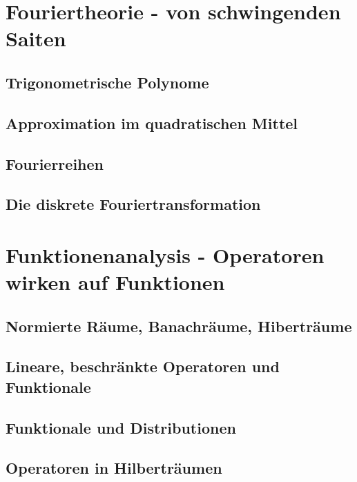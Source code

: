 \documentclass[a4paper]{article}
\begin{document}
\newpage
\section{Fouriertheorie - von schwingenden Saiten}
\subsection{Trigonometrische Polynome}


\subsection{Approximation im quadratischen Mittel}


\subsection{Fourierreihen}


\subsection{Die diskrete Fouriertransformation}



\newpage
\section{Funktionenanalysis - Operatoren wirken auf Funktionen}
\subsection{Normierte Räume, Banachräume, Hiberträume}


\subsection{Lineare, beschränkte Operatoren und Funktionale}


\subsection{Funktionale und Distributionen}


\subsection{Operatoren in Hilberträumen}
\end{document}
